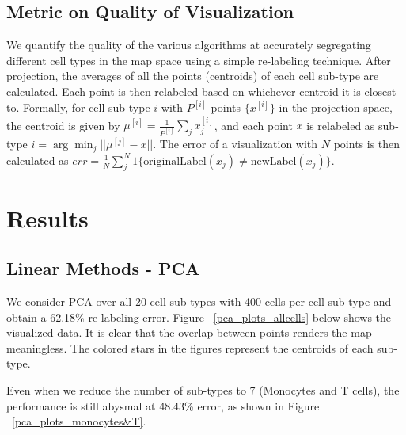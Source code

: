 \documentclass{article}
\begin{document}
\subsection{Metric on Quality of Visualization}
We quantify the quality of the various algorithms at accurately segregating different cell types in the map space using a simple re-labeling technique. After projection, the averages of all the points (centroids) of each cell sub-type are calculated. Each point is then relabeled based on whichever centroid it is closest to. Formally, for cell sub-type $i$ with $P^{[i]}$ points $\{x^{[i]}\}$ in the projection space, the centroid is given by $\mu^{[i]} = \frac{1}{P^{[i]}} \sum_{j} x_j^{[i]}$, and each point $x$ is relabeled as sub-type $i = \arg \min_j ||\mu^{[j]} - x||$. The error of a visualization with $N$ points is then calculated as $err = \frac{1}{N} \sum_j^N 1\{\text{originalLabel}(x_j) \neq \text{newLabel}(x_j) \}$.

\section{Results}

\subsection{Linear Methods - PCA}
We consider PCA over all 20 cell sub-types with 400 cells per cell sub-type and obtain a 62.18\% re-labeling error. Figure ~\ref{pca_plots_allcells} below shows the visualized data. It is clear that the overlap between points renders the map meaningless. The colored stars in the figures represent the centroids of each sub-type.

Even when we reduce the number of sub-types to 7 (Monocytes and T cells), the performance is still abysmal at 48.43\% error, as shown in Figure ~\ref{pca_plots_monocytes&T}.
\end{document}
